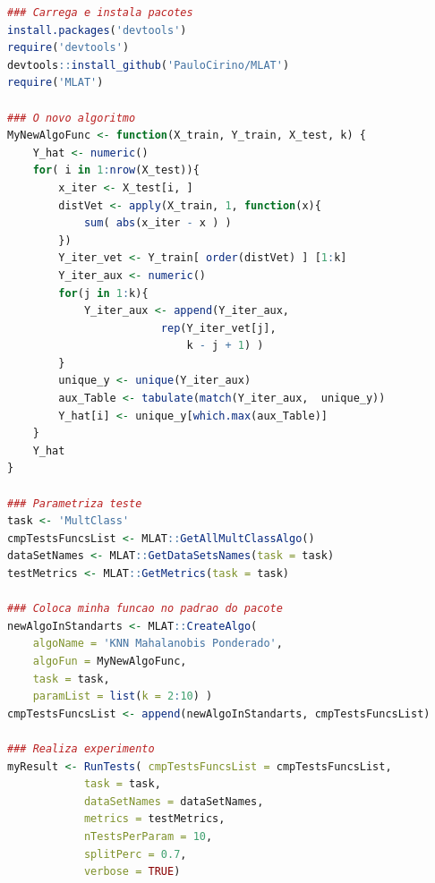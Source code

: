 \begin{lstlisting}[language=R]
### Carrega e instala pacotes
install.packages('devtools')
require('devtools')
devtools::install_github('PauloCirino/MLAT')
require('MLAT')

### O novo algoritmo
MyNewAlgoFunc <- function(X_train, Y_train, X_test, k) {
	Y_hat <- numeric()
	for( i in 1:nrow(X_test)){
		x_iter <- X_test[i, ]
		distVet <- apply(X_train, 1, function(x){
			sum( abs(x_iter - x ) )
		})
		Y_iter_vet <- Y_train[ order(distVet) ] [1:k]
		Y_iter_aux <- numeric()
		for(j in 1:k){
			Y_iter_aux <- append(Y_iter_aux,
						rep(Y_iter_vet[j],
							k - j + 1) )
		}
		unique_y <- unique(Y_iter_aux)
		aux_Table <- tabulate(match(Y_iter_aux,  unique_y))
		Y_hat[i] <- unique_y[which.max(aux_Table)]
	}
	Y_hat
}

### Parametriza teste
task <- 'MultClass'
cmpTestsFuncsList <- MLAT::GetAllMultClassAlgo()
dataSetNames <- MLAT::GetDataSetsNames(task = task)
testMetrics <- MLAT::GetMetrics(task = task)

### Coloca minha funcao no padrao do pacote
newAlgoInStandarts <- MLAT::CreateAlgo(  
	algoName = 'KNN Mahalanobis Ponderado', 
	algoFun = MyNewAlgoFunc, 
	task = task, 
	paramList = list(k = 2:10) )
cmpTestsFuncsList <- append(newAlgoInStandarts, cmpTestsFuncsList)

### Realiza experimento
myResult <- RunTests( cmpTestsFuncsList = cmpTestsFuncsList,
			task = task,
			dataSetNames = dataSetNames,
			metrics = testMetrics,
			nTestsPerParam = 10,
			splitPerc = 0.7, 
			verbose = TRUE)

\end{lstlisting}

